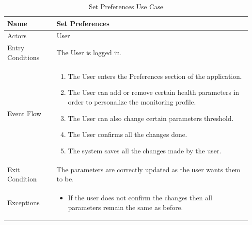 \begin{enumerate}
\FloatBarrier
\begin{table}[h]
\begin{tabular}{|p{3.4cm}|p{}|}
\hline
Name             & Set Preferences \\ \hline
Actors           & User  \\ \hline
Entry Conditions & The User is logged in. \\ \hline
Event Flow       & \begin{enumerate}
            \item The User enters the Preferences section of the application.
            \item The User can add or remove certain health parameters in order to personalize the monitoring profile.
            \item The User can also change certain parameters threshold.
            \item The User confirms all the changes done.
            \item The system saves all the changes made by the user.
        \end{enumerate}\\ \hline
Exit Condition   & The parameters are correctly updated as the user wants them to be.\\ \hline
Exceptions       & \begin{itemize}
\item If the user does not confirm the changes then all parameters remain the same as before. 
\end{itemize} \\ \hline
\end{tabular}
\caption{Set Preferences  Use Case}
\end{table}
\FloatBarrier


\end{enumerate}

